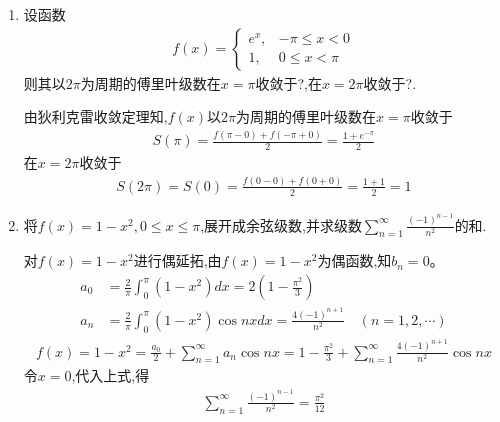 \documentclass[12pt, a4paper, oneside, UTF8]{ctexbook}
\begin{document}
\begin{enumerate}[label=\arabic*.,start=15]
    \item 设函数
    \begin{align*}
    f(x)=\begin{cases}
    e^x, & -\pi\leq x<0 \\
    1, & 0\leq x<\pi
    \end{cases}
    \end{align*}
    则其以$2\pi$为周期的傅里叶级数在$x=\pi$收敛于?,在$x=2\pi$收敛于?.
    \begin{solution}
    由狄利克雷收敛定理知,$f(x)$以$2\pi$为周期的傅里叶级数在$x=\pi$收敛于
    \begin{align*}
    S(\pi)=\frac{f(\pi-0)+f(-\pi+0)}{2}=\frac{1+e^{-\pi}}{2}
    \end{align*}
    在$x=2\pi$收敛于
    \begin{align*}
    S(2\pi)=S(0)=\frac{f(0-0)+f(0+0)}{2}=\frac{1+1}{2}=1
    \end{align*}
    \end{solution}
    
    \item 将$f(x)=1-x^2,0\leq x\leq\pi$,展开成余弦级数,并求级数$\sum_{n=1}^{\infty}\frac{(-1)^{n-1}}{n^2}$的和.
    
    \begin{solution}
    对$f(x)=1-x^2$进行偶延拓,由$f(x)=1-x^2$为偶函数,知$b_n=0$。
    \begin{align*}
    a_0&=\frac{2}{\pi}\int_0^\pi(1-x^2)dx=2\left(1-\frac{\pi^2}{3}\right) \\
    a_n&=\frac{2}{\pi}\int_0^\pi(1-x^2)\cos nx dx=\frac{4(-1)^{n+1}}{n^2} \quad (n=1,2,\cdots)
    \end{align*}
    \begin{align*}
    f(x)=1-x^2=\frac{a_0}{2}+\sum_{n=1}^{\infty}a_n\cos nx=1-\frac{\pi^2}{3}+\sum_{n=1}^{\infty}\frac{4(-1)^{n+1}}{n^2}\cos nx
    \end{align*}
    令$x=0$,代入上式,得
    \begin{align*}
    \sum_{n=1}^{\infty}\frac{(-1)^{n-1}}{n^2}=\frac{\pi^2}{12}
    \end{align*}
    \end{solution}
\end{enumerate}

\ifx\allfiles\undefined
\end{document}
